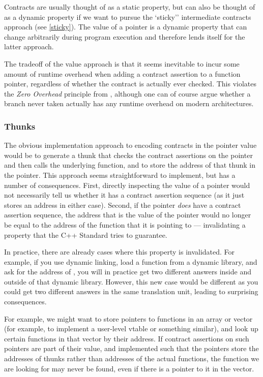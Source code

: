 Contracts are usually thought of as a static property, but can also be thought of as a dynamic property if we want to pursue the `sticky'' intermediate contracts approach (see \ref{sticky}). The value of a pointer is a dynamic property that can change arbitrarily during program execution and therefore lends itself for the latter approach. 

The tradeoff of the value approach is that it seems inevitable to incur some amount of runtime overhead when adding a contract assertion to a function pointer, regardless of whether the contract is actually ever checked. This violates the \emph{Zero Overhead} principle from \cite{P2900R8}, although one can of course argue whether a branch never taken actually has any runtime overhead on modern architectures. 

\subsubsection{Thunks}

The obvious implementation approach to encoding contracts in the pointer value would be to generate a thunk that checks the contract assertions on the pointer and then calls the underlying function, and to store the address of that thunk in the pointer. This approach seems straightforward to implement, but has a number of consequences. First, directly inspecting the value of a pointer would not necessarily tell us whether it has a contract assertion sequence (as it just stores an address in either case). Second, if the pointer \emph{does} have a contract assertion sequence, the address that is the value of the pointer would no longer be equal to the address of the function that it is pointing to --- invalidating a property that the C++ Standard tries to guarantee.

In practice, there are already cases where this property is invalidated. For example, if you use dynamic linking, load a function  from a dynamic library, and ask for the address of , you will in practice get two different answers inside and outside of that dynamic library. However, this new case would be different as you could get two different answers in the same translation unit, leading to surprising consequences.

For example, we might want to store pointers to functions in an array or vector (for example, to implement a user-level vtable or something similar), and look up certain functions in that vector by their address. If contract assertions on such pointers are part of their value, and implemented such that the pointers store the addresses of thunks rather than addresses of the actual functions, the function we are looking for may never be found, even if there is a pointer to it in the vector.

